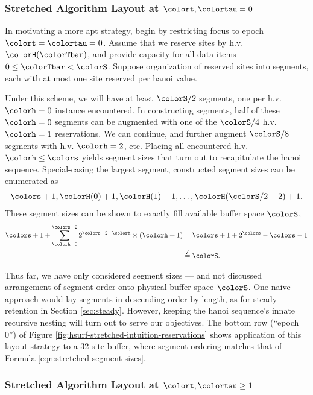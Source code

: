 \subsubsection{Stretched Algorithm Layout at $\colort,\colortau=0$}

In motivating a more apt strategy, begin by restricting focus to epoch $\colort=\colortau=0$.
Assume that we reserve sites by h.v. $\colorH(\colorTbar)$, and provide capacity for all data items $0\leq \colorTbar < \colorS$.
Suppose organization of reserved sites into segments, each with at most one site reserved per hanoi value.

Under this scheme, we will have at least $\colorS/2$ segments, one per h.v. $\colorh=0$ instance encountered.
In constructing segments, half of these $\colorh=0$ segments can be augmented with one of the $\colorS/4$ h.v. $\colorh=1$ reservations.
We can continue, and further augment $\colorS/8$ segments with h.v. $\colorh=2$, etc.
Placing all encountered h.v. $\colorh\leq\colors$ yields segment sizes that turn out to recapitulate the hanoi sequence.
Special-casing the largest segment, constructed segment sizes can be enumerated as
\begin{align}
\colors + 1, \colorH(0) + 1, \colorH(1) + 1, \ldots, \colorH(\colorS/2 - 2) + 1.
\label{eqn:stretched-segment-sizes}
\end{align}
These segment sizes can be shown to exactly fill available buffer space $\colorS$,
\begin{align*}
\colors + 1
+  \sum_{\colorh = 0}^{\colors - 2}
2^{\colors - 2 - \colorh} \times (\colorh + 1)
&=
\colors + 1 +
2^{\colors} - \colors - 1\\
&\stackrel{\checkmark}{=}
\colorS.
\end{align*}

Thus far, we have only considered segment sizes --- and not discussed arrangement of segment order onto physical buffer space $\colorS$.
One naive approach would lay segments in descending order by length, as for steady retention in Section \ref{sec:steady}.
However, keeping the hanoi sequence's innate recursive nesting will turn out to serve our objectives.
The bottom row (``epoch 0'') of Figure \ref{fig:hsurf-stretched-intuition-reservations} shows application of this layout strategy to a 32-site buffer, where segment ordering matches that of Formula \ref{eqn:stretched-segment-sizes}.

\subsubsection{Stretched Algorithm Layout at $\colort,\colortau\geq1$}

